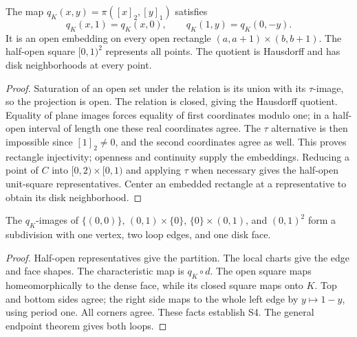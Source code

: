 \begin{lemma}\label{lem:klein-charts}

  The map $q_K(x,y)=\pi([x]_2,[y]_1)$ satisfies
  \[
    q_K(x,1)=q_K(x,0),\qquad q_K(1,y)=q_K(0,-y).
  \]
  It is an open embedding on every open rectangle
  $(a,a+1)\times(b,b+1)$. The half-open square $[0,1)^2$ represents all points.
  The quotient is Hausdorff and has disk neighborhoods at every point.
\end{lemma}
\begin{proof}

  Saturation of an open set under the relation is its union with its
  $\tau$-image, so the projection is open. The relation is closed, giving the
  Hausdorff quotient. Equality of plane images forces equality of first
  coordinates modulo one; in a half-open interval of length one these real
  coordinates agree. The $\tau$ alternative is then impossible since
  $[1]_2\ne0$, and the second coordinates agree as well. This proves rectangle
  injectivity; openness and continuity supply the embeddings. Reducing a point
  of $C$ into $[0,2)\times[0,1)$ and applying $\tau$ when necessary gives
  the half-open unit-square representatives. Center an embedded rectangle
  at a representative to obtain its disk neighborhood.
\end{proof}

\begin{proposition}\label{prop:klein-subdivision}

  The $q_K$-images of $\{(0,0)\}$, $(0,1)\times\{0\}$,
  $\{0\}\times(0,1)$, and $(0,1)^2$ form a subdivision with one vertex,
  two loop edges, and one disk face.
\end{proposition}
\begin{proof}

  Half-open representatives give the partition. The local charts give
  the edge and face shapes. The characteristic map is $q_K\circ d$.
  The open square maps homeomorphically to the dense face, while its closed
  square maps onto $K$. Top and bottom sides agree; the right side maps to
  the whole left edge by $y\mapsto1-y$, using period one. All corners agree.
  These facts establish S4. The general endpoint theorem gives both loops.
\end{proof}

